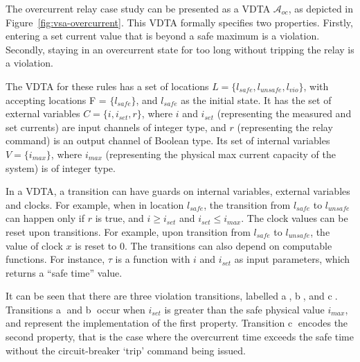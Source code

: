 \begin{example}
	\label{eg:vdta}
	The overcurrent relay case study can be presented as a \ac{VDTA} $\mathcal{A}_{oc}$, as depicted in Figure~\ref{fig:vsa-overcurrent}. 
	This \ac{VDTA} formally specifies two properties.
	Firstly, entering a set current value that is beyond a safe maximum is a violation.
	Secondly, staying in an overcurrent state for too long without tripping the relay is a violation.
	
	The \ac{VDTA} for these rules has a set of locations $L = \{ l_{safe},l_{unsafe}, l_{vio}\}$, with accepting locations F = $\{l_{safe}\}$, and $l_{safe}$ as the initial state. 
	It has the set of external variables  $C = \{i, i_{set}, r\}$, where $i$ and $i_{set}$ (representing the measured and set currents) are input channels of integer type, and $r$ (representing the relay command) is an output channel of Boolean type.  
	Its set of internal variables $V = \{i_{max}\}$, where $i_{max}$ (representing the physical max current capacity of the system) is of integer type.
	
	
	In a VDTA, a transition can have guards on internal variables, external variables and clocks. 
	For example, when in location $l_{safe}$, the transition from $l_{safe}$ to $l_{unsafe}$ can happen only if $r$ is true, and $i \geq i_{set}$ and $i_{set} \leq i_{max}$. 
	The clock values can be reset upon transitions. For example, upon transition from $l_{safe}$ to $l_{unsafe}$, the value of clock $x$ is reset to 0.
	The transitions can also depend on computable functions.
	For instance, $\tau$ is a function with $i$ and $i_{set}$ as input parameters, which returns a ``safe time'' value.
	
	It can be seen that there are three violation transitions, labelled \textcircled{a}, \textcircled{b}, and \textcircled{c}.
	Transitions \textcircled{a} and \textcircled{b} occur when ${i_{set}}$ is greater than the safe physical value $i_{max}$, and represent the implementation of the first property.
	Transition \textcircled{c} encodes the second property, that is the case where the overcurrent time exceeds the safe time without the circuit-breaker `trip' command being issued.
\end{example}

